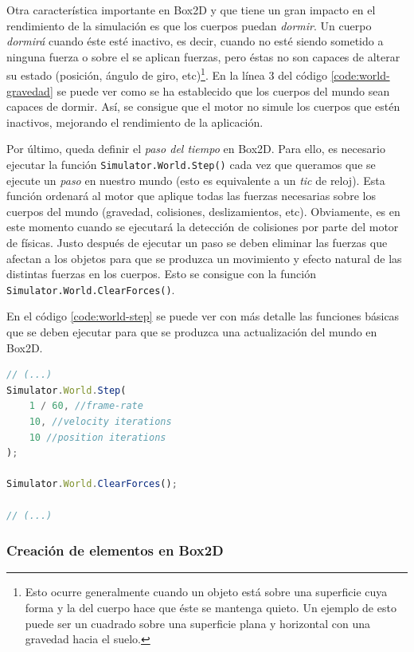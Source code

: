 Otra característica importante en Box2D y que tiene un gran impacto en el rendimiento de la simulación es que los cuerpos puedan \emph{dormir}. Un cuerpo \emph{dormirá} cuando éste esté inactivo, es decir, cuando no esté siendo sometido a ninguna fuerza o sobre el se aplican fuerzas, pero éstas no son capaces de alterar su estado (posición, ángulo de giro, etc)\footnote{Esto ocurre generalmente cuando un objeto está sobre una superficie cuya forma y la del cuerpo hace que éste se mantenga quieto. Un ejemplo de esto puede ser un cuadrado sobre una superficie plana y horizontal con una gravedad hacia el suelo.}. En la línea 3 del código \ref{code:world-gravedad} se puede ver como se ha establecido que los cuerpos del mundo sean capaces de dormir. Así, se consigue que el motor no simule los cuerpos que estén inactivos, mejorando el rendimiento de la aplicación.

Por último, queda definir el \emph{paso del tiempo} en Box2D. Para ello, es necesario ejecutar la función \texttt{Simulator.World.Step()} cada vez que queramos que se ejecute un \emph{paso} en nuestro mundo (esto es equivalente a un \emph{tic} de reloj). Esta función ordenará al motor que aplique todas las fuerzas necesarias sobre los cuerpos del mundo (gravedad, colisiones, deslizamientos, etc). Obviamente, es en este momento cuando se ejecutará la detección de colisiones por parte del motor de físicas. Justo después de ejecutar un paso se deben eliminar las fuerzas que afectan a los objetos para que se produzca un movimiento y efecto natural de las distintas fuerzas en los cuerpos. Esto se consigue con la función \texttt{Simulator.World.ClearForces()}.

En el código \ref{code:world-step} se puede ver con más detalle las funciones básicas que se deben ejecutar para que se produzca una actualización del mundo en Box2D.

\begin{lstlisting}[language={Javascript},label={code:world-step}, caption={Actualización del mundo en \texttt{Box2D}.}]
// (...)
Simulator.World.Step(
	1 / 60, //frame-rate
	10, //velocity iterations
	10 //position iterations
);

Simulator.World.ClearForces();

// (...)
\end{lstlisting}


\subsubsection{Creación de elementos en Box2D}


